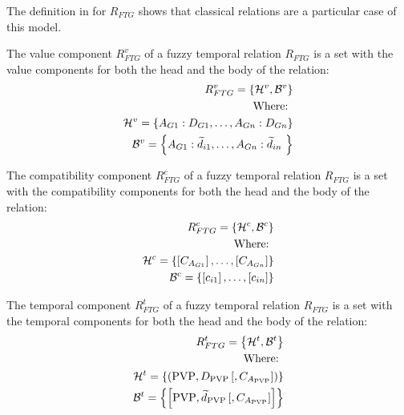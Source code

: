 The definition in \cite{Medina1994} for $R_{FTG}$ shows that classical relations are a particular case of this model. 

\begin{definition}
\label{def:value-component}
The value component $R^{v}_{FTG}$ of a fuzzy temporal relation $R_{FTG}$ is a set with the value components for both the head and the body of the relation:
\begin{align}
\label{eq:value-component}
R^{v}_{FTG} = \left \lbrace \mathcal{H}^{v},\mathcal{B}^{v} \right \rbrace \\
\nonumber
\text{Where: } \\
\nonumber
\mathcal{H}^{v} = \left \lbrace A_{G1}:D_{G1}, \ldots,  A_{Gn}:D_{Gn} \right \rbrace \\
\nonumber
\mathcal{B}^ {v} = \left \lbrace A_{G1}:\widetilde{d}_{i1}, \ldots,  A_{Gn}:\widetilde{d}_{in}\ \right \rbrace \\
\end{align}
\end{definition}

\begin{definition}
\label{def:compatibility-component}
The compatibility component $R^{c}_{FTG}$ of a fuzzy temporal relation $R_{FTG}$ is a set with the compatibility components for both the head and the body of the relation:
\begin{align}
\label{eq:compatibility-component}
R^{c}_{FTG} = \left \lbrace \mathcal{H}^{c},\mathcal{B}^{c} \right \rbrace \\
\nonumber
\text{Where: } \\
\nonumber
\mathcal{H}^{c} = \left \lbrace \left[C_{A_{G1}} \right], \ldots,  \left[C_{A_{Gn}} \right] \right \rbrace \\
\nonumber
\mathcal{B}^ {c} = \left \lbrace \left[ c_{i1} \right], \ldots, \left[ c_{in} \right] \right \rbrace \\
\end{align}
\end{definition}


\begin{definition}
\label{def:temporal-component}
The temporal component $R^{t}_{FTG}$ of a fuzzy temporal relation $R_{FTG}$ is a set with the temporal components for both the head and the body of the relation:
\begin{align}
\label{eq:temporal-component}
R^{t}_{FTG} = \left \lbrace \mathcal{H}^{t},\mathcal{B}^{t} \right \rbrace \\
\nonumber
\text{Where: } \\
\nonumber
\mathcal{H}^{t} = \left \lbrace \left( \text{PVP}, D_{\text{PVP}}\left[,C_{A_{\text{PVP}}} \right] \right) \right \rbrace \\
\nonumber
\mathcal{B}^ {t} = \left \lbrace  \left[ \text{PVP}, \widetilde{d}_{\text{PVP}} \left[,C_{A_{\text{PVP}}} \right] \right]  \right \rbrace \\
\end{align}
\end{definition}

